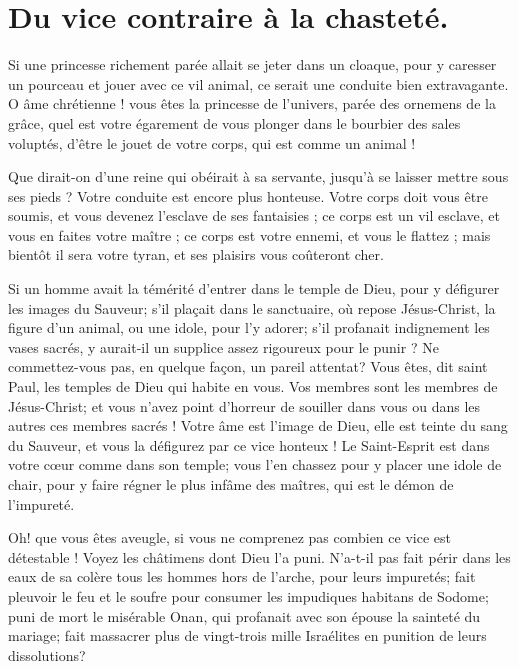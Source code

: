 \documentclass[instructions.tex]{subfiles}
\begin{document}
 
\chapter{Du vice contraire à la chasteté.}
 
\primo Si une princesse richement parée allait se jeter dans un cloaque, pour y caresser un pourceau et jouer avec ce vil animal, ce serait une conduite bien extravagante. O âme chrétienne ! vous êtes la princesse de l’univers, parée des ornemens de la grâce, quel est votre égarement de vous plonger dans le bourbier des sales voluptés, d’être le jouet de votre corps, qui est comme un animal !
 
Que dirait-on d’une reine qui obéirait à sa servante, jusqu’à se laisser mettre sous ses pieds ? Votre conduite est encore plus honteuse. Votre corps doit vous être soumis, et vous devenez l’esclave de ses fantaisies ; ce corps est un vil esclave, et vous en faites votre maître ; ce corps est votre ennemi, et vous le flattez ; mais bientôt il sera votre tyran, et ses plaisirs vous coûteront cher.
 
Si un homme avait la témérité d’entrer dans le temple de Dieu, pour y défigurer les images du Sauveur; s’il plaçait dans le sanctuaire, où repose Jésus-Christ, la figure d’un animal, ou une idole, pour l’y adorer; s’il profanait indignement les vases sacrés, y aurait-il un supplice assez rigoureux pour le punir ? Ne commettez-vous pas, en quelque façon, un pareil attentat? Vous êtes, dit saint Paul, les temples de Dieu qui habite en vous. Vos membres sont les membres de Jésus-Christ; et vous n’avez point d’horreur de souiller dans vous ou dans les autres ces membres sacrés ! Votre âme est l’image de Dieu, elle est teinte du sang du Sauveur, et vous la défigurez par ce vice honteux ! Le Saint-Esprit est dans votre cœur comme dans son temple; vous l’en chassez pour y placer une idole de chair, pour y faire régner le plus infâme des maîtres, qui est le démon de l’impureté.
 
\secundo Oh! que vous êtes aveugle, si vous ne comprenez pas combien ce vice est détestable ! Voyez les châtimens dont Dieu l’a puni. N’a-t-il pas fait périr dans les eaux de sa colère tous les hommes hors de l’arche, pour leurs impuretés; fait pleuvoir le feu et le soufre pour consumer les impudiques habitans de Sodome; puni de mort le misérable Onan, qui profanait avec son épouse la sainteté du mariage; fait massacrer plus de vingt-trois mille Israélites en punition de leurs dissolutions?
 
\end{document}

